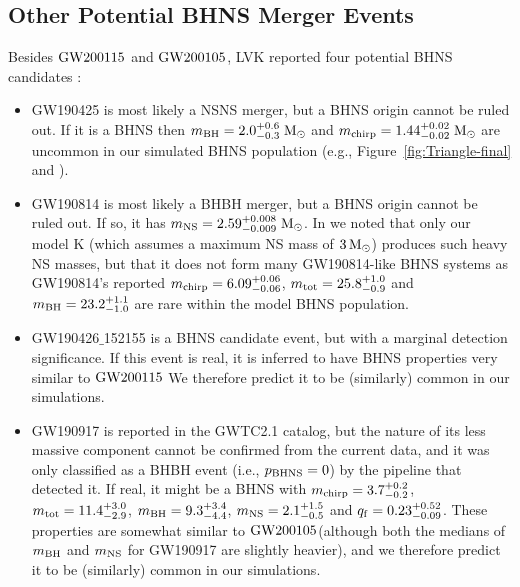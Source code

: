 \documentclass{aastex63}
\newcommand{\Msun}{\ensuremath{\,\rm{M}_{\odot}}\xspace}
\newcommand{\mnsf}{\ensuremath{m_{\rm{NS}}}\xspace}
\newcommand{\mbhf}{\ensuremath{m_{\rm{BH}}}\xspace}
\newcommand{\mtotf}{\ensuremath{m_{\rm{tot}}}\xspace}
\newcommand{\mchirpf}{\ensuremath{{m}_{\rm{chirp}}}\xspace}
\newcommand{\qf}{\ensuremath{q_{\rm{f}}}\xspace}
\newcommand{\gwone}{\ensuremath{\rm{GW200115}}\xspace}
\newcommand{\gwzero}{\ensuremath{\rm{GW200105}}\xspace}
\begin{document}
\subsection{Other Potential BHNS Merger Events}
%
Besides \gwone and \gwzero,  LVK reported four potential \ac{BHNS} candidates \citep{GWTC2,GWTC2point1}:
%
\begin{itemize}
%
    \item GW190425 is most likely a NSNS merger, but a \ac{BHNS} origin cannot be ruled out.  If it is a \ac{BHNS} then $\mbhf = 2.0^{+0.6}_{-0.3}$\Msun and $\mchirpf = 1.44^{+0.02}_{-0.02}$\Msun are uncommon in our simulated \ac{BHNS} population (e.g., Figure~\ref{fig:Triangle-final} and \citealt[][]{Broekgaarden:2021}).
%
    \item GW190814 is most likely a BHBH merger, but a \ac{BHNS} origin cannot be ruled out. If so, it has $\mnsf =  2.59^{+0.008}_{-0.009}$\Msun. In \citet{Broekgaarden:2021} we noted that only our model K (which assumes a maximum NS mass of $3\Msun$) produces such heavy \ac{NS} masses, but that it does not form many GW190814-like \ac{BHNS} systems as GW190814's reported $\mchirpf =6.09^{+0.06}_{-0.06}$, $\mtotf = 25.8^{+1.0}_{-0.9}$ and $\mbhf=23.2^{+1.1}_{-1.0}$ are rare within the model \ac{BHNS} population. 
    
    
  
%
    \item GW190426$\_$152155 is a \ac{BHNS} candidate event, but with a marginal detection significance. If this event is real, it is inferred to have \ac{BHNS} properties very similar to \gwone \citep[see Figure~4 in][]{Abbott:2021-first-NSBH}
    We therefore predict it to be (similarly) common in our simulations.
%
    \item GW190917 is reported in the GWTC2.1 catalog, but the nature of its less massive component cannot be confirmed from the current data, and it was only classified as a BHBH event (i.e., $p_{\rm{BHNS}} = 0$) by the pipeline that detected it. If real, it might be a \ac{BHNS} with $\mchirpf = 3.7^{+0.2}_{-0.2}$, $\mtotf =11.4^{+3.0}_{-2.9}$, $\mbhf = 9.3^{+3.4}_{-4.4}$, $\mnsf = 2.1^{+1.5}_{-0.5}$ and $\qf =  0.23^{+0.52}_{-0.09}$. These properties are somewhat similar to \gwzero (although both the medians of \mbhf and \mnsf for GW190917 are slightly heavier), and we therefore predict it to be (similarly) common in our simulations.
\end{itemize}
\end{document}
